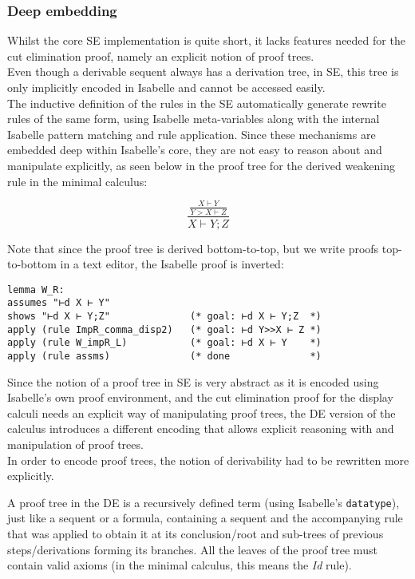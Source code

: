 \subsubsection{Deep embedding}\label{deep-embedding}

Whilst the core SE implementation is quite short, it lacks features
needed for the cut elimination proof, namely an explicit notion of proof
trees.\\ Even though a derivable sequent always has a derivation tree,
in SE, this tree is only implicitly encoded in Isabelle and cannot be
accessed easily.\\ The inductive definition of the rules in the SE
automatically generate rewrite rules of the same form, using Isabelle
meta-variables along with the internal Isabelle pattern matching and
rule application. Since these mechanisms are embedded deep within
Isabelle's core, they are not easy to reason about and manipulate
explicitly, as seen below in the proof tree for the derived weakening
rule in the minimal calculus:

$$\frac{\displaystyle \frac
{X \vdash Y}
{Y > X \vdash Z} }
{X \vdash Y ; Z}$$

Note that since the proof tree is derived bottom-to-top, but we write
proofs top-to-bottom in a text editor, the Isabelle proof is inverted:

\begin{verbatim}
lemma W_R: 
assumes "⊢d X ⊢ Y"
shows "⊢d X ⊢ Y;Z"              (* goal: ⊢d X ⊢ Y;Z  *)
apply (rule ImpR_comma_disp2)   (* goal: ⊢d Y>>X ⊢ Z *)
apply (rule W_impR_L)           (* goal: ⊢d X ⊢ Y    *)
apply (rule assms)              (* done              *)
\end{verbatim}

Since the notion of a proof tree in SE is very abstract as it is encoded
using Isabelle's own proof environment, and the cut elimination proof
for the display calculi needs an explicit way of manipulating proof
trees, the DE version of the calculus introduces a different encoding
that allows explicit reasoning with and manipulation of proof trees.\\
In order to encode proof trees, the notion of derivability had to be
rewritten more explicitly.

A proof tree in the DE is a recursively defined term (using Isabelle's
\texttt{datatype}), just like a sequent or a formula, containing a
sequent and the accompanying rule that was applied to obtain it at its
conclusion/root and sub-trees of previous steps/derivations forming its
branches. All the leaves of the proof tree must contain valid axioms (in
the minimal calculus, this means the \emph{Id} rule).

